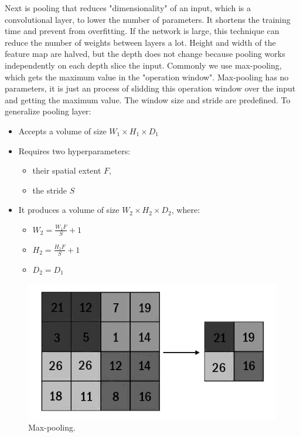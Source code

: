 \documentclass[conference]{IEEEtran}
\begin{document}
Next is pooling that reduces "dimensionality" of an input, which is a convolutional layer, to lower the number of parameters. It shortens the training time and prevent from overfitting. If the network is large, this technique can reduce the number of weights between layers a lot. Height and width of the feature map are halved, but the depth does not change because pooling works independently on each depth slice the input.
Commonly we use max-pooling, which gets the maximum value in the "operation window". Max-pooling has no parameters, it is just an process of slidding this operation window over the input and getting the maximum value. The window size and stride are predefined. To generalize pooling layer:
\begin{itemize}
    \item Accepts a volume of size $W_{1}×H_{1}×D_{1}$
    \item Requires two hyperparameters:
    \begin{itemize}
        \item their spatial extent $F$,
        \item the stride $S$
    \end{itemize}
    \item It produces a volume of size $W_{2}×H_{2}×D_{2}$, where:
    \begin{itemize}
        \item $W_{2}=\frac{W_{1}F}{S} + 1$
        \item $H_{2}=\frac{H_{1}F}{S} + 1$
        \item $D_{2}=D_{1}$
    \end{itemize}
\end{itemize}
\begin{center}
    \begin{figure}[hbt!]
 \centering
    \includegraphics[scale=0.35]{maxpool-b.png}
	    \caption{Max-pooling.}
	    \label{fig:my_label}
\end{figure}
\end{center}
\end{document}
